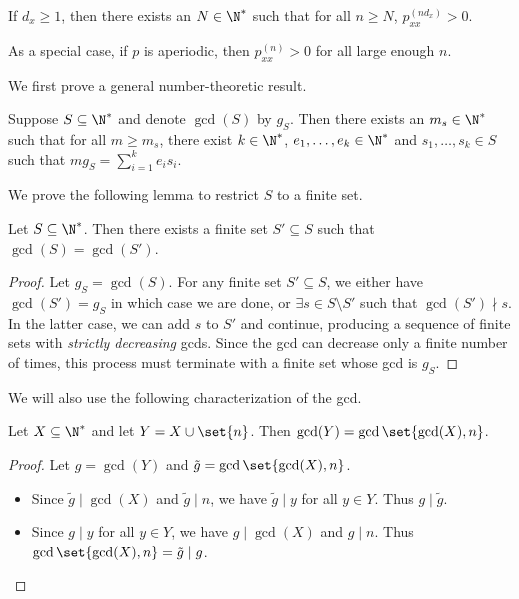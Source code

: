 \begin{theorem*} \label{thm:schur_recurrence}
    If $d_x \ge 1$, then there exists an $N \in \N^*$ such that for all
    $n \ge N$, $p_{xx}^{(nd_x)} > 0$.

    As a special case, if $p$ is aperiodic, then $p_{xx}^{(n)} > 0$ for all
    large enough $n$.
\end{theorem*}
We first prove a general number-theoretic result.

\begin{theorem} \label{thm:schur}
    Suppose $S \subseteq \N^*$ and denote $\gcd(S)$ by $g_S$.
    Then there exists an $m_s \in \N^*$ such that for all $m \ge m_s$,
    there exist $k \in \N^*$, $e_1, \dots, e_k \in \N^*$ and
    $s_1, \dots, s_k \in S$ such that $m g_S = \sum_{i=1}^k e_i s_i$.
\end{theorem}
We prove the following lemma to restrict $S$ to a finite set.
\begin{lemma}
    Let $S \subseteq \N^*$.
    Then there exists a finite set $S' \subseteq S$ such that
    $\gcd(S) = \gcd(S')$.
\end{lemma}
\begin{proof}
    Let $g_S = \gcd(S)$.
    For any finite set $S' \subseteq S$, we either have $\gcd(S') = g_S$
    in which case we are done, or $\exists s \in S \setminus S'$ such that
    $\gcd(S') \nmid s$.
    In the latter case, we can add $s$ to $S'$ and continue, producing a
    sequence of finite sets with \emph{strictly decreasing} gcds.
    Since the gcd can decrease only a finite number of times, this process
    must terminate with a finite set whose gcd is $g_S$.
\end{proof}
We will also use the following characterization of the gcd.
\begin{lemma}
    Let $X \subseteq \N^*$ and let $Y = X \cup \set{n}$.
    Then $\gcd(Y) = \gcd\set{\gcd(X), n}$.
\end{lemma}
\begin{proof}
    Let $g = \gcd(Y)$ and $\tilde{g} = \gcd\set{\gcd(X), n}$.
    \begin{itemize}
        \item Since $\tilde{g} \mid \gcd(X)$ and $\tilde{g} \mid n$, we have
        $\tilde{g} \mid y$ for all $y \in Y$.
        Thus $g \mid \tilde{g}$.
        \item Since $g \mid y$ for all $y \in Y$, we have $g \mid \gcd(X)$
        and $g \mid n$.
        Thus $\gcd\set{\gcd(X), n} = \tilde{g} \mid g$. \qedhere
    \end{itemize}
\end{proof}
